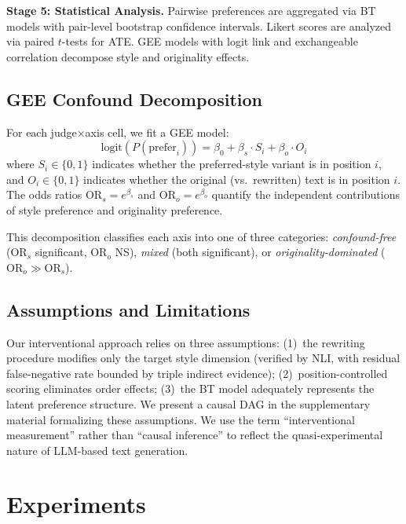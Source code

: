 \documentclass[10pt,twocolumn]{article}
\begin{document}
\textbf{Stage 5: Statistical Analysis.}
Pairwise preferences are aggregated via BT models with pair-level bootstrap confidence intervals.
Likert scores are analyzed via paired $t$-tests for ATE.
GEE models with logit link and exchangeable correlation decompose style and originality effects.

\subsection{GEE Confound Decomposition}\label{sec:gee}

For each judge$\times$axis cell, we fit a GEE model:
\begin{equation}
\text{logit}(P(\text{prefer}_i)) = \beta_0 + \beta_s \cdot S_i + \beta_o \cdot O_i
\end{equation}
where $S_i \in \{0,1\}$ indicates whether the preferred-style variant is in position $i$, and $O_i \in \{0,1\}$ indicates whether the original (vs.\ rewritten) text is in position $i$.
The odds ratios $\text{OR}_s = e^{\beta_s}$ and $\text{OR}_o = e^{\beta_o}$ quantify the independent contributions of style preference and originality preference.

This decomposition classifies each axis into one of three categories:
\textit{confound-free} ($\text{OR}_s$ significant, $\text{OR}_o$ NS),
\textit{mixed} (both significant), or
\textit{originality-dominated} ($\text{OR}_o \gg \text{OR}_s$).

\subsection{Assumptions and Limitations}

Our interventional approach relies on three assumptions:
(1)~the rewriting procedure modifies only the target style dimension (verified by NLI, with residual false-negative rate bounded by triple indirect evidence);
(2)~position-controlled scoring eliminates order effects;
(3)~the BT model adequately represents the latent preference structure.
We present a causal DAG in the supplementary material formalizing these assumptions.
We use the term ``interventional measurement'' rather than ``causal inference'' to reflect the quasi-experimental nature of LLM-based text generation.

\section{Experiments}
\end{document}
